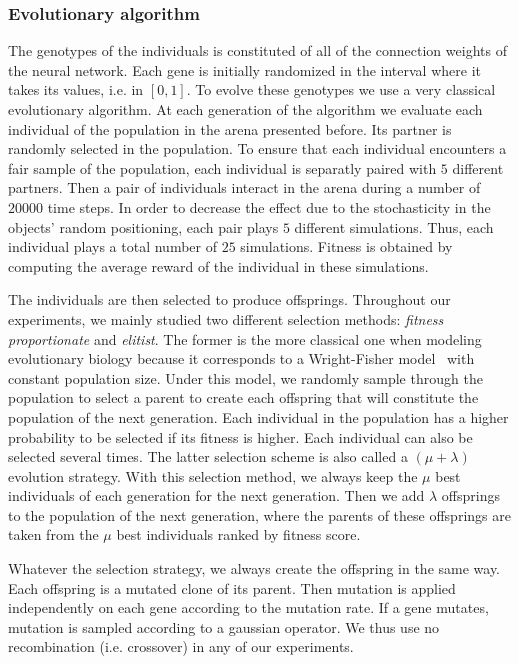    \subsubsection{Evolutionary algorithm} The genotypes of the individuals is constituted of all of the connection weights of the neural network. Each gene is initially randomized in the interval where it takes its values, i.e. in \([0,1]\). To evolve these genotypes we use a very classical evolutionary algorithm. At each generation of the algorithm we evaluate each individual of the population in the arena presented before. Its partner is randomly selected in the population. To ensure that each individual encounters a fair sample of the population, each individual is separatly paired with $5$ different partners. Then a pair of individuals interact in the arena during a number of $20000$ time steps. In order to decrease the effect due to the stochasticity in the objects' random positioning, each pair plays $5$ different simulations. Thus, each individual plays a total number of $25$ simulations. Fitness is obtained by computing the average reward of the individual in these simulations.

    The individuals are then selected to produce offsprings. Throughout our experiments, we mainly studied two different selection methods: \emph{fitness proportionate} and \emph{elitist}. The former is the more classical one when modeling evolutionary biology because it corresponds to a Wright-Fisher model~\parencite{Wright1931} with constant population size. Under this model, we randomly sample through the population to select a parent to create each offspring that will constitute the population of the next generation. Each individual in the population has a higher probability to be selected if its fitness is higher. Each individual can also be selected several times. The latter selection scheme is also called a \((\mu + \lambda)\) evolution strategy. With this selection method, we always keep the $\mu$ best individuals of each generation for the next generation. Then we add $\lambda$ offsprings to the population of the next generation, where the parents of these offsprings are taken from the $\mu$ best individuals ranked by fitness score.


    Whatever the selection strategy, we always create the offspring in the same way. Each offspring is a mutated clone of its parent. Then mutation is applied independently on each gene according to the mutation rate. If a gene mutates, mutation is sampled according to a gaussian operator. We thus use no recombination (i.e. crossover) in any of our experiments.



